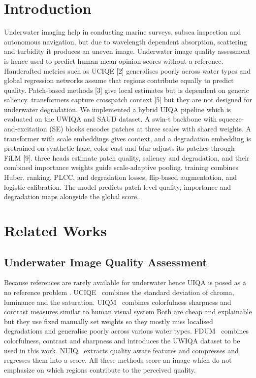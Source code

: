 \documentclass[conference]{IEEEtran}
\begin{document}
\section{Introduction}


Underwater imaging help in conducting marine surveys, subsea inspection and autonomous navigation, but due to wavelength dependent absorption, scattering and turbidity it produces an uneven image. Underwater image quality assessment is hence used to predict human mean opinion scores without a reference. Handcrafted metrics such as UCIQE [2] generalises poorly across water types and global regression networks assume that regions contribute equally to predict quality. Patch-based methods [3] give local estimates but is dependent on generic saliency. transformers capture crosspatch context [5] but they are not designed for underwater degradation.
We implemented a hybrid UIQA pipeline which is evaluated on the UWIQA and SAUD dataset. A swin-t backbone  with squeeze-and-excitation (SE) blocks encodes patches at three scales with shared weights. A transformer with scale embeddings gives context, and a degradation embedding is pretrained on synthetic haze, color cast and blur adjusts its patches through FiLM [9]. three heads estimate patch quality, saliency and degradation, and their combined importance weights guide scale-adaptive pooling. training combines Huber, ranking, PLCC, and degradation losses, flip-based augmentation, and logistic calibration. The model predicts patch level quality, importance  and degradation maps alongside the global score.


\section{Related Works}
\vspace{0.3cm}
\subsection{Underwater Image Quality Assessment}

Because  references are rarely available for underwater hence UIQA is posed as a no reference problem . UCIQE~\cite{yang2015uciqe} combines the standard deviation of chroma, luminance and the saturation. UIQM~\cite{panetta2016uiqm} combines colorfulness sharpness and contrast measures similar to human visual system Both are cheap and explainable but they use fixed manually set weights so they mostly miss localised degradations and generalise poorly across various water types. FDUM~\cite{yang2021uwiqa} combines colorfulness, contrast and sharpness and introduces the UWIQA dataset to be used in this work. NUIQ~\cite{jiang2022nuiq} extracts quality aware features and compresses and regresses them into a score. All these methods score an image which do not emphasize on which regions contribute to the perceived quality.
\vspace{0.3cm}
\end{document}
